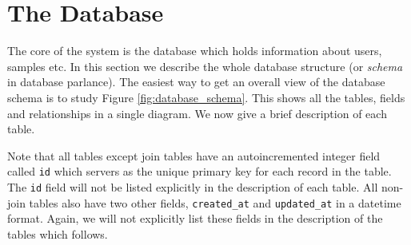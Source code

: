 \documentclass[12pt]{article}
\begin{document}
\section{The Database}
The core of the system is the database which holds information about 
users, samples etc. In this section we describe the whole database
structure (or \emph{schema} in database parlance).
The easiest way to get an overall view of the database schema is to
study Figure \ref{fig:database_schema}. This shows
all the tables, fields and relationships in a single diagram.
We now give a brief description of each table.

Note that all tables except join tables have an autoincremented integer field
called \verb=id= which servers as the unique primary key for each record
in the table. The \verb=id= field will not be listed explicitly in the
description of each table. All non-join tables also have two other
fields, \verb=created_at= and \verb=updated_at= in a datetime format.
Again, we will not explicitly list these fields in the description
of the tables which follows.
\end{document}
